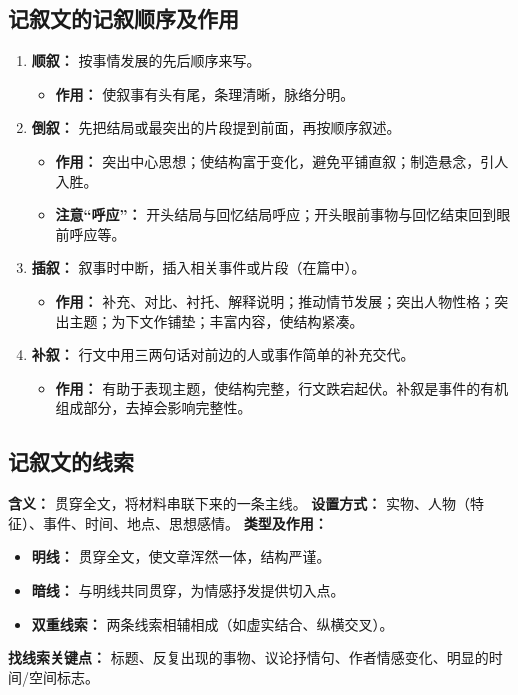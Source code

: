 \documentclass[11pt, a4paper]{ctexart}
\begin{document}
\subsection{记叙文的记叙顺序及作用}
\begin{enumerate}
    \item \textbf{顺叙：} 按事情发展的先后顺序来写。
    \begin{itemize}
        \item \textbf{作用：} 使叙事有头有尾，条理清晰，脉络分明。
    \end{itemize}
    \item \textbf{倒叙：} 先把结局或最突出的片段提到前面，再按顺序叙述。
    \begin{itemize}
        \item \textbf{作用：} 突出中心思想；使结构富于变化，避免平铺直叙；制造悬念，引人入胜。
        \item \textbf{注意“呼应”：} 开头结局与回忆结局呼应；开头眼前事物与回忆结束回到眼前呼应等。
    \end{itemize}
    \item \textbf{插叙：} 叙事时中断，插入相关事件或片段（在篇中）。
    \begin{itemize}
        \item \textbf{作用：} 补充、对比、衬托、解释说明；推动情节发展；突出人物性格；突出主题；为下文作铺垫；丰富内容，使结构紧凑。
    \end{itemize}
    \item \textbf{补叙：} 行文中用三两句话对前边的人或事作简单的补充交代。
    \begin{itemize}
        \item \textbf{作用：} 有助于表现主题，使结构完整，行文跌宕起伏。补叙是事件的有机组成部分，去掉会影响完整性。
    \end{itemize}
\end{enumerate}

\subsection{记叙文的线索}
\textbf{含义：} 贯穿全文，将材料串联下来的一条主线。
\textbf{设置方式：} 实物、人物（特征）、事件、时间、地点、思想感情。
\textbf{类型及作用：}
\begin{itemize}
    \item \textbf{明线：} 贯穿全文，使文章浑然一体，结构严谨。
    \item \textbf{暗线：} 与明线共同贯穿，为情感抒发提供切入点。
    \item \textbf{双重线索：} 两条线索相辅相成（如虚实结合、纵横交叉）。
\end{itemize}
\textbf{找线索关键点：} 标题、反复出现的事物、议论抒情句、作者情感变化、明显的时间/空间标志。
\end{document}
